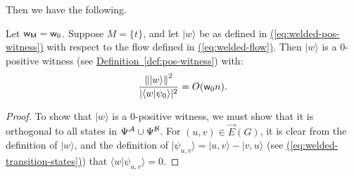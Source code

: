 \documentclass{theoretics}
\newcommand{\eq}[1]{\hyperref[eq:#1]{(\ref*{eq:#1})}}
\newcommand{\defin}[1]{\hyperref[def:#1]{Definition~\ref*{def:#1}}}
\def\ket#1{{\lvert}#1\rangle}
\renewcommand{\>}{\rangle}
\newcommand{\<}{\langle}
\renewcommand{\(}{\left(}
\renewcommand{\)}{\right)}
\def\braket#1#2{{{\langle}#1\vert}#2\rangle}
\def\norm#1{\left\| #1 \right\|}
\def\w{{\sf w}}
\begin{document}
\noindent Then we have the following.
\begin{lemma}\label{lem:welded-pos-analysis}
Let $\w_{\sf M}=\w_0$.
Suppose $M=\{t\}$, and let $\ket{w}$ be as defined in \eq{welded-pos-witness} with respect to the flow defined in \eq{welded-flow}. 
Then $\ket{w}$ is a 0-positive witness (see \defin{pos-witness}) with: 
\begin{equation*}
\frac{\norm{\ket{w}}^2}{|\braket{w}{\psi_0}|^2} = O(\w_0n).
\end{equation*}
\end{lemma}
\begin{proof}
To show that $\ket{w}$ is a 0-positive witness, we must show that it is orthogonal to all states in $\Psi^{\cal A}\cup\Psi^{\cal B}$. For $(u,v)\in\overrightarrow{E}(G)$, it is clear from the definition of $\ket{w}$, and the definition of $\ket{\psi_{u,v}}=\ket{u,v}-\ket{v,u}$ (see \eq{welded-transition-states}) that $\braket{w}{\psi_{u,v}}=0$. 


\end{proof}
\end{document}
